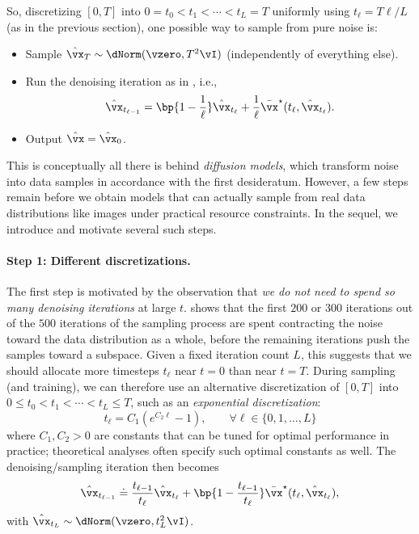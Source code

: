 \documentclass[../../book-main.tex]{subfiles}
\begin{document}
So, discretizing \([0, T]\) into \(0 = t_{0} < t_{1} < \cdots < t_{L}
= T\) uniformly using \(t_{\ell} = T\ell / L\) (as in the previous
section), one possible way to sample from pure noise is:
\begin{itemize}
    \item Sample \(\hat{\vx}_{T} \sim \dNorm(\vzero, T^{2}\vI)\)
        (independently of everything else).
    \item Run the denoising iteration as in
        , i.e.,
        \begin{equation}\label{eq:denoising-iteration-basic}
            \hat{\vx}_{t_{\ell - 1}} = \bp{1 -
            \frac{1}{\ell}}\hat{\vx}_{t_{\ell}} +
            \frac{1}{\ell}\bar{\vx}^{\star}(t_{\ell}, \hat{\vx}_{t_{\ell}}).
        \end{equation}
    \item Output \(\hat{\vx} = \hat{\vx}_{0}\).
\end{itemize}
This is conceptually all there is behind \textit{diffusion models},
which transform noise into data samples in accordance with the first
desideratum. However, a few steps remain before we obtain models that
can actually sample from real data distributions like images under
practical resource constraints. In the sequel, we introduce and
motivate several such steps.

\paragraph{Step 1: Different discretizations.} The first step is motivated
by the observation that \textit{we do not need to spend so many
denoising iterations} at large \(t\). 
shows that the first \(200\) or \(300\) iterations out of the \(500\)
iterations of the sampling process are spent contracting the noise
toward the data distribution as a whole, before the remaining
iterations push the samples toward a subspace. Given a fixed
iteration count \(L\), this suggests that we should allocate more
timesteps \(t_{\ell}\) near \(t = 0\) than near \(t = T\). During
sampling (and training), we can therefore use an alternative
discretization of \([0, T]\) into \(0 \leq t_{0} < t_{1} < \cdots <
t_{L} \leq T\), such as an \textit{exponential discretization}:
\begin{equation}\label{eq:denoising_exponential_discretization}
    t_{\ell} = C_{1}(e^{C_{2}\ell} - 1), \qquad \forall \ell \in \{0,
    1, \dots, L\}
\end{equation}
where \(C_{1}, C_{2} > 0\) are constants that can be tuned for
optimal performance in practice; theoretical analyses often specify
such optimal constants as well. The denoising/sampling iteration then
becomes
\begin{equation}\label{eq:denoising_iteration}
    \hat{\vx}_{t_{\ell - 1}} \doteq \frac{t_{\ell -
    1}}{t_{\ell}}\hat{\vx}_{t_{\ell}} + \bp{1 - \frac{t_{\ell -
    1}}{t_{\ell}}}\bar{\vx}^{\star}(t_{\ell}, \hat{\vx}_{t_{\ell}}),
\end{equation}
with \(\hat{\vx}_{t_{L}} \sim \dNorm(\vzero, t_{L}^{2}\vI)\).
\end{document}
